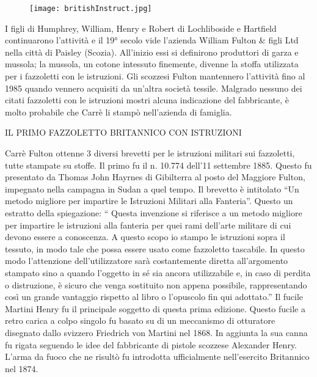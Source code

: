 \newpage
   
\begin{figure}[h]
	\centering
		\texttt{[image: britishInstruct.jpg]}
	\caption{}
	\label{fig:britishInstruct}
\end{figure}

\newpage

I figli di Humphrey, William, Henry e Robert di Lochliboside e Hartfield continuarono l’attività e il 19° secolo vide l’azienda William Fulton \& figli Ltd nella città di Paisley (Scozia). All’inizio essi si definirono produttori di garza e mussola; la mussola, un cotone intessuto finemente, divenne la stoffa  utilizzata per i fazzoletti con le istruzioni. Gli scozzesi Fulton mantennero l’attività fino al 1985 quando vennero acquisiti da un’altra società tessile. Malgrado nessuno dei citati fazzoletti con le istruzioni mostri alcuna indicazione del fabbricante, è molto probabile che Carrè li stampò nell’azienda di famiglia.

IL PRIMO FAZZOLETTO BRITANNICO CON ISTRUZIONI

   Carrè Fulton ottenne 3 diversi brevetti per le istruzioni militari sui fazzoletti, tutte stampate su stoffe. Il primo fu il n. 10.774 dell’11 settembre 1885. Questo fu presentato da Thomas John Hayrnes di Gibilterra al posto del Maggiore Fulton, impegnato nella campagna in Sudan a quel tempo. Il brevetto è intitolato “Un metodo migliore per impartire le Istruzioni Militari alla Fanteria”.  Questo un estratto della spiegazione: “ Questa invenzione si riferisce a un metodo migliore per impartire le istruzioni alla fanteria per quei rami dell’arte militare di cui devono essere a conoscenza. A questo scopo io stampo le istruzioni sopra il tessuto, in modo tale che possa essere  usato come fazzoletto tascabile. In questo modo l’attenzione dell’utilizzatore sarà costantemente diretta all’argomento stampato sino a quando l’oggetto in sé sia ancora utilizzabile e, in caso di perdita o distruzione, è sicuro che venga sostituito non appena possibile, rappresentando così un grande vantaggio rispetto al libro o l’opuscolo fin qui adottato.” 
   Il fucile Martini Henry fu il principale soggetto di questa prima edizione. Questo fucile a retro carica a colpo singolo fu basato su di un meccanismo di otturatore disegnato dallo svizzero Friedrich von Martini nel 1868. In aggiunta la sua canna fu rigata seguendo le idee del fabbricante di pistole scozzese Alexander Henry. L’arma da fuoco che ne risultò fu introdotta ufficialmente nell’esercito Britannico nel 1874.
   
\newpage

   
   
